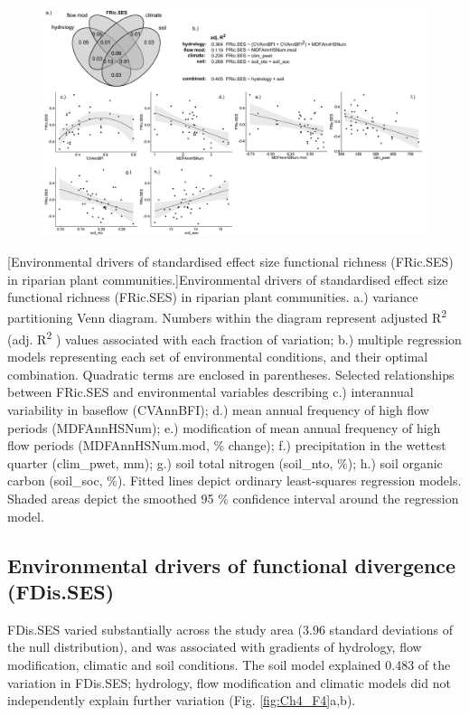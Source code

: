 \documentclass[openright,12pt,a4paper]{memoir}
\begin{document}
\begin{landscape}
\begin{figure}[ht]
\centering
\includegraphics[height = \textheight]{Ch4FRicSES.pdf} %
\end{figure}
\clearpage %
\end{landscape}
\begingroup
{}[Environmental drivers of standardised effect size functional richness (FRic.SES) in riparian plant communities.]{\small{Environmental drivers of standardised effect size functional richness (FRic.SES) in riparian plant communities. a.) variance partitioning Venn diagram. Numbers within the diagram represent adjusted R\textsuperscript{2}  (adj. R\textsuperscript{2} ) values associated with each fraction of variation; b.) multiple regression models representing each set of environmental conditions, and their optimal combination. Quadratic terms are enclosed in parentheses. Selected relationships between FRic.SES and environmental variables describing c.) interannual variability in baseflow (CVAnnBFI); d.) mean annual frequency of high flow periods (MDFAnnHSNum); e.) modification of mean annual frequency of high flow periods (MDFAnnHSNum.mod, \% change); f.) precipitation in the wettest quarter (clim\_pwet, mm); g.) soil total nitrogen (soil\_nto, \%); h.) soil organic carbon (soil\_soc, \%). Fitted lines depict ordinary least-squares regression models. Shaded areas depict the smoothed 95 \% confidence interval around the regression model.}}
\label{fig:Ch4_F3} %
\endgroup
\clearpage

\subsection{Environmental drivers of functional divergence (FDis.SES)}
FDis.SES varied substantially across the study area (3.96 standard deviations of the null distribution), and was associated with gradients of hydrology, flow modification, climatic and soil conditions. The soil model explained 0.483 of the variation in FDis.SES; hydrology, flow modification and climatic models did not independently explain further variation (Fig. \ref{fig:Ch4_F4}a,b). 
\end{document}
